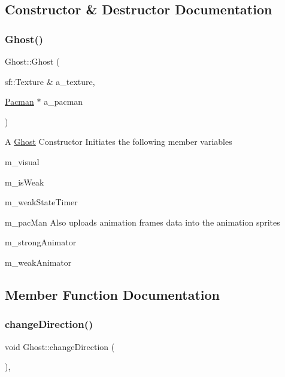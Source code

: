 \subsection{Constructor \& Destructor Documentation}
\mbox{\label{class_ghost_a931627708b35e6f0b6f9d106adbaee1f}} 
\subsubsection{\texorpdfstring{Ghost()}{Ghost()}}
{\footnotesize\ttfamily Ghost\+::\+Ghost (\begin{DoxyParamCaption}\item[{sf\+::\+Texture \&}]{a\+\_\+texture,  }\item[{\hyperlink{class_pacman}{Pacman} $\ast$}]{a\+\_\+pacman }\end{DoxyParamCaption})}

A \hyperlink{class_ghost}{Ghost} Constructor Initiates the following member variables
\begin{DoxyItemize}
\item m\+\_\+visual
\item m\+\_\+is\+Weak
\item m\+\_\+weak\+State\+Timer
\item m\+\_\+pac\+Man Also uploads animation frames data into the animation sprites
\item m\+\_\+strong\+Animator
\item m\+\_\+weak\+Animator 
\end{DoxyItemize}

\subsection{Member Function Documentation}
\mbox{\label{class_ghost_a08831fa01afa61f91365ce82cf33bf1b}} 
\subsubsection{\texorpdfstring{change\+Direction()}{changeDirection()}}
{\footnotesize\ttfamily void Ghost\+::change\+Direction (\begin{DoxyParamCaption}{ }\end{DoxyParamCaption})\hspace{0.3cm}{\ttfamily [protected]}, {\ttfamily [virtual]}}

